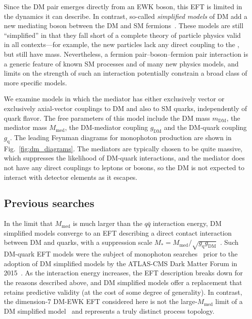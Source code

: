 \documentclass[oneside, letterpaper, 12pt, oldfontcommands]{memoir}
\begin{document}
Since the DM pair emerges directly from an EWK boson, this EFT is limited in the dynamics it can describe. In contrast, so-called \textit{simplified models} of DM add
a new mediating boson between the DM and SM fermions~\cite{ref:1507.00966}. These models are still ``simplified'' in that they fall short of a complete theory of particle
physics valid in all contexts---for example, the new particles lack any direct coupling to the \PH, but still have mass.
Nevertheless, a fermion pair--boson--fermion pair interaction is a generic feature of known SM processes
and of many new physics models, and limits on the strength of such an interaction potentially constrain a broad class of more specific models.

We examine models in which the mediator has either exclusively vector or exclusively axial-vector couplings to DM and also to SM quarks, independently
of quark flavor. The free parameters of this model include
the DM mass $m_\mathrm{DM}$, the mediator mass $M_\mathrm{med}$, the DM-mediator coupling $g_\mathrm{DM}$ and the DM-quark coupling $g_\mathrm{q}$.
The leading Feynman diagrams for monophoton production are shown in Fig.~\ref{fig:dm_diagrams}. The mediators are typically chosen to be quite massive,
which suppresses the likelihood of DM-quark interactions, and the mediator does not have any direct couplings to leptons or bosons,
so the DM is not expected to interact with detector elements as it escapes.

\subsection{Previous searches} \label{sec:introduction_dm_previous_searches}
In the limit that $M_\mathrm{med}$ is much larger than the $q\bar{q}$ interaction energy, DM simplified models converge to an EFT describing a direct contact
interaction between DM and quarks, with a suppression scale $M_\mathrm{*} = M_\mathrm{med}/\sqrt{g_\mathrm{q}g_\mathrm{DM}}$~\cite{ref:1603.04156}.
Such DM-quark EFT models were the subject of monophoton searches~\cite{ref:j.physletb.2016.01.057, ref:PhysRevD.91.012008} prior to the adoption of
DM simplified models by the ATLAS-CMS Dark Matter Forum in 2015~\cite{ref:1507.00966}.
As the interaction energy increases, the EFT description breaks down for the reasons described above, and DM simplified models
offer a replacement that retains predictive validity (at the cost of some degree of generality).
In contrast, the dimension-7 DM-EWK EFT considered here is not the large-$M_\mathrm{med}$ limit of a DM simplified model~\cite{ref:1507.00966} and represents a truly distinct
process topology.
\end{document}
